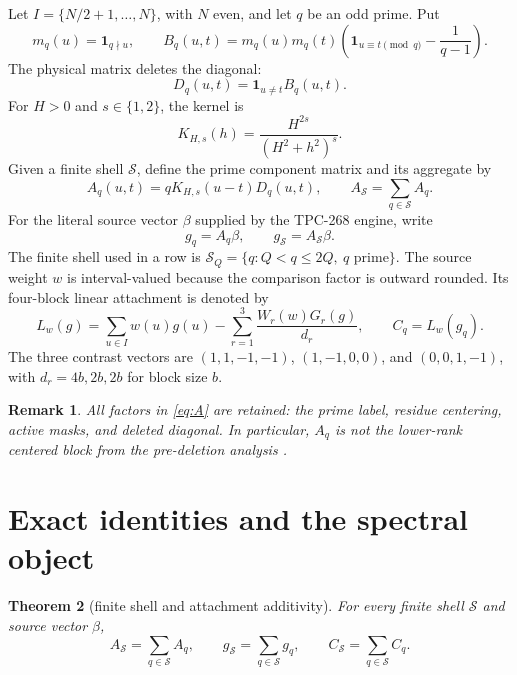 \documentclass[11pt]{article}
\newtheorem{theorem}{Theorem}
\newtheorem{remark}[theorem]{Remark}
\newcommand{\one}{\mathbf{1}}
\newcommand{\shell}{\mathcal S}
\begin{document}
Let $I=\{N/2+1,\ldots,N\}$, with $N$ even, and let $q$ be an odd prime.  Put
\begin{equation}
 m_q(u)=\one_{q\nmid u},\qquad
 B_q(u,t)=m_q(u)m_q(t)
 \left(\one_{u\equiv t\pmod q}-\frac{1}{q-1}\right).
 \label{eq:B}
\end{equation}
The physical matrix deletes the diagonal:
\begin{equation}
 D_q(u,t)=\one_{u\ne t}B_q(u,t).
 \label{eq:D}
\end{equation}
For $H>0$ and $s\in\{1,2\}$, the kernel is
\begin{equation}
 K_{H,s}(h)=\frac{H^{2s}}{(H^2+h^2)^s}.
 \label{eq:K}
\end{equation}
Given a finite shell $\shell$, define the prime component matrix and its
aggregate by
\begin{equation}
 A_q(u,t)=qK_{H,s}(u-t)D_q(u,t),
 \qquad A_{\shell}=\sum_{q\in\shell}A_q.
 \label{eq:A}
\end{equation}
For the literal source vector $\beta$ supplied by the TPC-268 engine, write
\begin{equation}
 g_q=A_q\beta,\qquad
 g_{\shell}=A_{\shell}\beta.
 \label{eq:g}
\end{equation}
The finite shell used in a row is $\shell_Q=\{q:Q<q\leq2Q,\ q$ prime$\}$.
The source weight $w$ is interval-valued because the comparison factor is
outward rounded.  Its four-block linear attachment is denoted by
\begin{equation}
 L_w(g)=\sum_{u\in I}w(u)g(u)
 -\sum_{r=1}^{3}\frac{W_r(w)G_r(g)}{d_r},
 \qquad C_q=L_w(g_q).
 \label{eq:L}
\end{equation}
The three contrast vectors are $(1,1,-1,-1)$,
$(1,-1,0,0)$, and $(0,0,1,-1)$, with $d_r=4b,2b,2b$ for block size $b$.

\begin{remark}
All factors in \eqref{eq:A} are retained: the prime label, residue
centering, active masks, and deleted diagonal.  In particular, $A_q$ is not
the lower-rank centered block from the pre-deletion analysis
\cite{tpc285}.
\end{remark}

\section{Exact identities and the spectral object}

\begin{theorem}[finite shell and attachment additivity]
For every finite shell $\shell$ and source vector $\beta$,
\begin{equation}
 A_{\shell}=\sum_{q\in\shell}A_q,
 \qquad g_{\shell}=\sum_{q\in\shell}g_q,
 \qquad C_{\shell}=\sum_{q\in\shell}C_q.
 \label{eq:add}
\end{equation}
\end{theorem}
\end{document}
